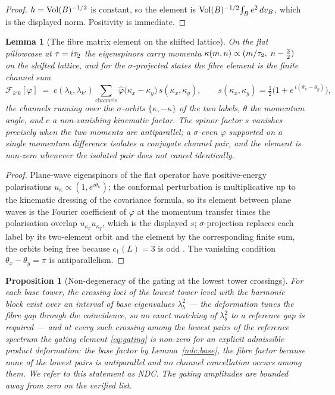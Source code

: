 \documentclass[11pt]{article}
\numberwithin{equation}{section}
\theoremstyle{plain}
\newtheorem{proposition}[theorem]{Proposition}
\newtheorem{lemma}[theorem]{Lemma}
\theoremstyle{definition}
\theoremstyle{remark}
\begin{document}
\begin{proof}
$h = \mathrm{Vol}(B)^{-1/2}$ is constant, so the element is
$\mathrm{Vol}(B)^{-1/2}\!\int_{B} e^{2}\,dv_{B}$, which is the displayed
norm. Positivity is immediate.
\end{proof}

\begin{lemma}[The fibre matrix element on the shifted
lattice]\label{ndc:fibre}
On the flat pillowcase at $\tau = i\tau_2$ the eigenspinors carry
momenta $\kappa(m, n) \propto (m/\tau_2,\; n - \tfrac{3}{2})$ on
the shifted lattice, and for the $\sigma$-projected states the
fibre element is the finite channel sum
\[
\mathcal{F}_{k'k}[\varphi] \;=\;
c(\lambda_{k}, \lambda_{k'})
\sum_{\text{channels}}
\hat{\varphi}\bigl(\kappa_{x} - \kappa_{y}\bigr)\,
s(\kappa_{x}, \kappa_{y}),
\qquad
s(\kappa_{x}, \kappa_{y}) =
\tfrac{1}{2}\bigl(1 + e^{\,i(\theta_{x} - \theta_{y})}\bigr),
\]
the channels running over the $\sigma$-orbits
$\{\kappa, -\kappa\}$ of the two labels, $\theta$ the momentum
angle, and $c$ a non-vanishing kinematic factor. The spinor factor
$s$ vanishes precisely when the two momenta are antiparallel; a
$\sigma$-even $\varphi$ supported on a single momentum difference
isolates a conjugate channel pair, and the element is non-zero
whenever the isolated pair does not cancel identically.
\end{lemma}

\begin{proof}
Plane-wave eigenspinors of the flat operator have positive-energy
polarisations $u_{\kappa} \propto (1, e^{i\theta_{\kappa}})$; the
conformal perturbation is multiplicative up to the kinematic
dressing of the covariance formula, so its element between plane
waves is the Fourier coefficient of $\varphi$ at the momentum
transfer times the polarisation overlap
$\bar{u}_{\kappa_{x}} u_{\kappa_{y}}$, which is the displayed $s$;
$\sigma$-projection replaces each label by its two-element orbit
and the element by the corresponding finite sum, the orbits being
free because $c_{1}(L) = 3$ is odd \cite{MEF3}. The vanishing
condition $\theta_{x} - \theta_{y} = \pi$ is antiparallelism.
\end{proof}

\begin{proposition}[Non-degeneracy of the gating at the lowest
tower crossings]\label{ndc:verdict}
For each base tower, the crossing loci of the lowest tower level
with the harmonic block exist over an interval of base eigenvalues
$\lambda_{b}^{2}$ --- the deformation tunes the fibre gap through
the coincidence, so no exact matching of $\lambda_{b}^{2}$ to a
reference gap is required --- and at every such crossing among the
lowest pairs of the reference spectrum the gating element
\eqref{eq:gating} is non-zero for an explicit admissible product
deformation: the base factor by Lemma~\textup{\ref{ndc:base}}, the
fibre factor because none of the lowest pairs is antiparallel and
no channel cancellation occurs among them. We refer to this
statement as NDC. The gating amplitudes are bounded away from zero
on the verified list.
\end{proposition}
\end{document}
